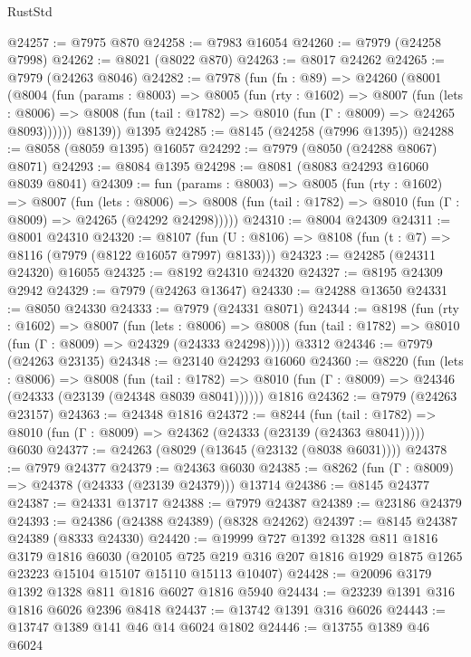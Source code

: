 \begin{lexlean}{RustStd}
\begin{coremodule}
@24257 := @7975 @870
@24258 := @7983 @16054
@24260 := @7979 (@24258 @7998)
@24262 := @8021 (@8022 @870)
@24263 := @8017 @24262
@24265 := @7979 (@24263 @8046)
@24282 := @7978
    (fun (fn : @89) =>
    @24260
      (@8001
        (@8004
          (fun (params : @8003) =>
          @8005
            (fun (rty : @1602) =>
            @8007
              (fun (lets : @8006) =>
              @8008 (fun (tail : @1782) => @8010 (fun (Γ : @8009) => @24265 @8093))))))
        @8139))
    @1395
@24285 := @8145 (@24258 (@7996 @1395))
@24288 := @8058 (@8059 @1395) @16057
@24292 := @7979 (@8050 (@24288 @8067) @8071)
@24293 := @8084 @1395
@24298 := @8081 (@8083 @24293 @16060 @8039 @8041)
@24309 := fun (params : @8003) =>
  @8005
    (fun (rty : @1602) =>
    @8007
      (fun (lets : @8006) =>
      @8008 (fun (tail : @1782) => @8010 (fun (Γ : @8009) => @24265 (@24292 @24298)))))
@24310 := @8004 @24309
@24311 := @8001 @24310
@24320 := @8107
    (fun (U : @8106) => @8108 (fun (t : @7) => @8116 (@7979 (@8122 @16057 @7997) @8133)))
@24323 := @24285 (@24311 @24320) @16055
@24325 := @8192 @24310 @24320
@24327 := @8195 @24309 @2942
@24329 := @7979 (@24263 @13647)
@24330 := @24288 @13650
@24331 := @8050 @24330
@24333 := @7979 (@24331 @8071)
@24344 := @8198
    (fun (rty : @1602) =>
    @8007
      (fun (lets : @8006) =>
      @8008 (fun (tail : @1782) => @8010 (fun (Γ : @8009) => @24329 (@24333 @24298)))))
    @3312
@24346 := @7979 (@24263 @23135)
@24348 := @23140 @24293 @16060
@24360 := @8220
    (fun (lets : @8006) =>
    @8008
      (fun (tail : @1782) =>
      @8010 (fun (Γ : @8009) => @24346 (@24333 (@23139 (@24348 @8039 @8041))))))
    @1816
@24362 := @7979 (@24263 @23157)
@24363 := @24348 @1816
@24372 := @8244
    (fun (tail : @1782) => @8010 (fun (Γ : @8009) => @24362 (@24333 (@23139 (@24363 @8041)))))
    @6030
@24377 := @24263 (@8029 (@13645 (@23132 (@8038 @6031))))
@24378 := @7979 @24377
@24379 := @24363 @6030
@24385 := @8262 (fun (Γ : @8009) => @24378 (@24333 (@23139 @24379))) @13714
@24386 := @8145 @24377
@24387 := @24331 @13717
@24388 := @7979 @24387
@24389 := @23186 @24379
@24393 := @24386 (@24388 @24389) (@8328 @24262)
@24397 := @8145 @24387 @24389 (@8333 @24330)
@24420 := @19999
    @727
    @1392
    @1328
    @811
    @1816
    @3179
    @1816
    @6030
    (@20105 @725 @219 @316 @207 @1816 @1929 @1875 @1265 @23223 @15104 @15107 @15110 @15113 @10407)
@24428 := @20096 @3179 @1392 @1328 @811 @1816 @6027 @1816 @5940
@24434 := @23239 @1391 @316 @1816 @6026 @2396 @8418
@24437 := @13742 @1391 @316 @6026
@24443 := @13747 @1389 @141 @46 @14 @6024 @1802
@24446 := @13755 @1389 @46 @6024

\end{coremodule}
\end{lexlean}
